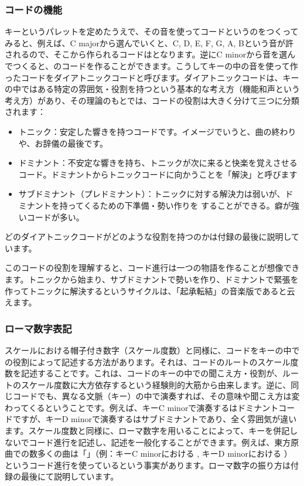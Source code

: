 \documentclass[11pt]{ltjarticle}
\newcommand{\wc}{\writechord}
\begin{document}
\subsubsection{コードの機能}
キーというパレットを定めたうえで、その音を使ってコードというのをつくってみると、例えば、C majorから選んでいくと、C, D, E, F, G, A, Bという音が許されるので、そこから作られるコードはとなります。逆にC minorから音を選んでつくると、のコードを作ることができます。こうしてキーの中の音を使って作ったコードをダイアトニックコードと呼びます。ダイアトニックコードは、キーの中ではある特定の雰囲気・役割を持つという基本的な考え方（機能和声という考え方）があり、その理論のもとでは、コードの役割は大きく分けて三つに分類されます：
\begin{itemize}
    \item トニック：安定した響きを持つコードです。イメージでいうと、曲の終わりや、お辞儀の最後です。
    \item ドミナント：不安定な響きを持ち、トニックが次に来ると快楽を覚えさせるコード。ドミナントからトニックコードに向かうことを「解決」と呼びます
    \item サブドミナント（プレドミナント）：トニックに対する解決力は弱いが、ドミナントを持ってくるための下準備・勢い作りを
することができる。癖が強いコードが多い。
\end{itemize}
どのダイアトニックコードがどのような役割を持つのかは付録の最後に説明しています。\par
このコードの役割を理解すると、コード進行は一つの物語を作ることが想像できます。トニックから始まり、サブドミナントで勢いを作り、ドミナントで緊張を作ってトニックに解決するというサイクルは、「起承転結」の音楽版であると云えます。
\subsubsection{ローマ数字表記}
スケールにおける帽子付き数字（スケール度数）と同様に、コードをキーの中での役割によって記述する方法があります。それは、コードのルートのスケール度数を記述することです。これは、コードのキーの中での聞こえ方・役割が、ルートのスケール度数に大方依存するという経験則的大筋から由来します。逆に、同じコードでも、異なる文脈（キー）の中で演奏すれば、その意味や聞こえ方は変わってくるということです。例えば、キーC minorで演奏するはドミナントコードですが、キーD minorで演奏するはサブドミナントであり、全く雰囲気が違います。スケール度数と同様に、ローマ数字を用いることによって、キーを併記しないでコード進行を記述し、記述を一般化することができます。例えば、東方原曲での数多くの曲は「」（例：キーC minorにおける \wc{Bb} \wc{Cm}, キーD minorにおける  ）というコード進行を使っているという事実があります。ローマ数字の振り方は付録の最後にて説明しています。
\end{document}
